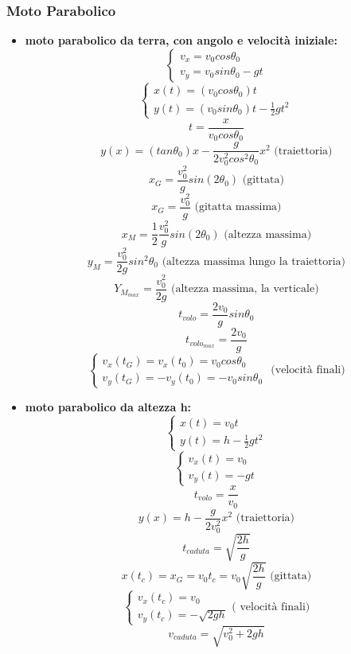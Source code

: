\documentclass[a4paper,12pt, oneside]{book}
\begin{document}
\subsubsection{Moto Parabolico}
\begin{itemize}
\item \textbf{moto parabolico da terra, con angolo e velocità iniziale:}
$$
\begin{cases}
v_x=v_0cos\theta_0\\
v_y=v_0sin\theta_0-gt
\end{cases}
$$
$$\begin{cases}
x(t)=(v_0cos\theta_0)t\\
y(t)=(v_0sin\theta_0)t-\frac{1}{2}gt^2
\end{cases}$$
$$t=\frac{x}{v_0cos\theta_0}$$
$$y(x)=(tan\theta_0)x-\frac{g}{2v_0^2cos^2\theta_0}x^2\mbox{ (traiettoria)}$$
$$x_G=\frac{v_0^2}{g}sin(2\theta_0)\mbox{ (gittata)}$$
$$x_G=\frac{v_0^2}{g}\mbox{ (gitatta massima)}$$
$$x_M=\frac{1}{2}\frac{v_0^2}{g}sin(2\theta_0)\mbox{ (altezza massima)}$$
$$y_M=\frac{v_0^2}{2g}sin^2\theta_0 \mbox{ (altezza massima lungo la traiettoria)}$$
$$Y_{M_{max}}=\frac{v_0^2}{2g}\mbox{ (altezza massima, la verticale)}$$
$$t_{volo}=\frac{2v_0}{g}sin\theta_0$$
$$t_{{volo}_{max}}=\frac{2v_0}{g}$$
$$\begin{cases}
v_x(t_G)=v_x(t_0)=v_0cos\theta_0\\
v_y(t_G)=-v_y(t_0)=-v_0sin\theta_0
\end{cases}\mbox{ (velocità finali)}$$
\item \textbf{moto parabolico da altezza h:}
$$\begin{cases}
x(t)=v_0t\\
y(t)=h-\frac{1}{2}gt^2
\end{cases}$$
$$\begin{cases}
v_x(t)=v_0\\
v_y(t)=-gt
\end{cases}$$
$$t_{volo}=\frac{x}{v_0}$$
$$y(x)=h-\frac{g}{2v_0^2}x^2\mbox{ (traiettoria)}$$
$$t_{caduta}=\sqrt{\frac{2h}{g}}$$
$$x(t_c)=x_G=v_0t_c=v_0\sqrt{\frac{2h}{g}}\mbox{ (gittata)}$$
$$\begin{cases}v_x(t_c)=v_0\\
v_y(t_c)=-\sqrt{2gh}\end{cases} \mbox{( velocità finali)}$$
$$v_{caduta}=\sqrt{v_0^2+2gh}$$
\end{itemize}
\end{document}
